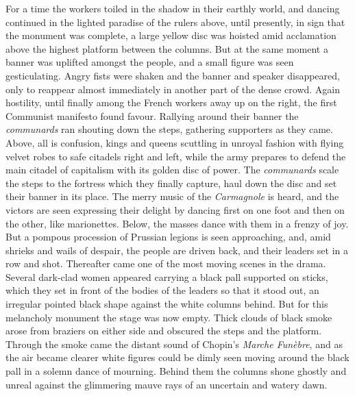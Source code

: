 For a time the workers toiled in the shadow in their earthly world, and dancing continued in the lighted paradise of the rulers above, until presently, in sign that the monument was complete, a large yellow disc was hoisted amid acclamation above the highest platform between the columns. But at the same moment a banner was uplifted amongst the people, and a small figure was seen gesticulating. Angry fists were shaken and the banner and speaker disappeared, only to reappear almost immediately in another part of the dense crowd. Again hostility, until finally among the French workers away up on the right, the first Communist manifesto found favour. Rallying around their banner the \emph{communards} ran shouting down the steps, gathering supporters as they came. Above, all is confusion, kings and queens scuttling in unroyal fashion with flying velvet robes to safe citadels right and left, while the army prepares to defend the main citadel of capitalism with its golden disc of power. The \emph{communards} scale the steps to the fortress which they finally capture, haul down the disc and set their banner in its place. The merry music of the \emph{Carmagnole} is heard, and the victors are seen expressing their delight by dancing first on one foot and then on the other, like marionettes. Below, the masses dance with them in a frenzy of joy. But a pompous procession of Prussian legions is seen approaching, and, amid shrieks and wails of despair, the people are driven back, and their leaders set in a row and shot. Thereafter came one of the most moving scenes in the drama. Several dark-clad women appeared carrying a black pall supported on sticks, which they set in front of the bodies of the leaders so that it stood out, an irregular pointed black shape against the white columns behind. But for this melancholy monument the stage was now empty. Thick clouds of black smoke arose from braziers on either side and obscured the steps and the platform. Through the smoke came the distant sound of Chopin's \emph{Marche Funèbre}, and as the air became clearer white figures could be dimly seen moving around the black pall in a solemn dance of mourning. Behind them the columns shone ghostly and unreal against the glimmering mauve rays of an uncertain and watery dawn.

